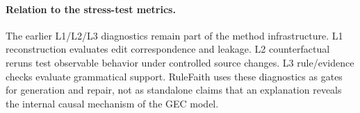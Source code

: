 \paragraph{Relation to the stress-test metrics.}
The earlier L1/L2/L3 diagnostics remain part of the method infrastructure. L1 reconstruction evaluates edit correspondence and leakage. L2 counterfactual reruns test observable behavior under controlled source changes. L3 rule/evidence checks evaluate grammatical support. RuleFaith uses these diagnostics as gates for generation and repair, not as standalone claims that an explanation reveals the internal causal mechanism of the GEC model.
